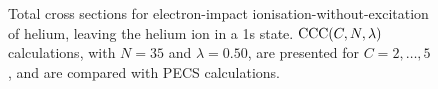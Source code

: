 \documentclass[]{article}
\begin{document}
%     

%     

%     

\begin{figure}[h]
  \begin{center}
    
  \end{center}
  \caption[TICS-without-excitation: $\mathrm{CCC}\lr{C, 35, 0.50}$]{
    Total cross sections for electron-impact ionisation-without-excitation of
    helium, leaving the helium ion in a 1s state.
    $\mathrm{CCC}(C, N, \lambda)$ calculations, with $N = 35$ and
    $\lambda = 0.50$, are presented for $C = 2, \dotsc, 5$, and are compared
    with PECS \cite{PhysRevA.81.022716} calculations.
  }
  \label{fig:cs_tics_iw_35}
\end{figure}
\end{document}
